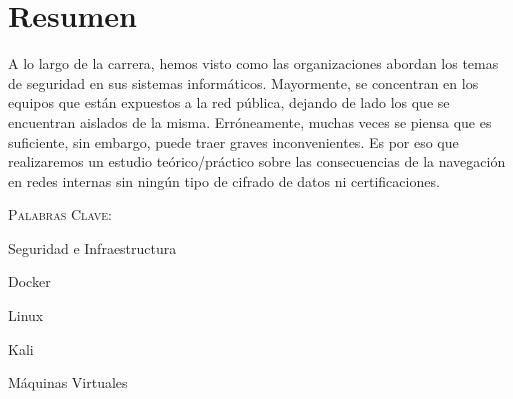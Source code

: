 \thispagestyle{empty}
\chapter*{Resumen}


\bigskip
A lo largo de la carrera, hemos visto como las organizaciones abordan los temas de seguridad en sus sistemas informáticos. Mayormente, se concentran en los equipos que están expuestos a la red pública, dejando de lado los que se encuentran aislados de la misma. Erróneamente, muchas veces se piensa que es suficiente, sin embargo, puede traer graves inconvenientes. Es por eso que realizaremos un estudio teórico/práctico sobre las consecuencias de la navegación en redes internas sin ningún tipo de cifrado de datos ni certificaciones.

\bigskip
\noindent \textsc{Palabras Clave:} \par

Seguridad e Infraestructura\par
Docker \par
Linux \par
Kali \par
Máquinas Virtuales  \par


